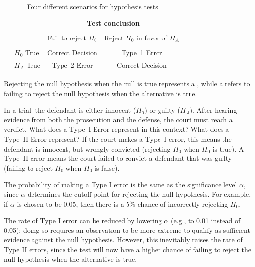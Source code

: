 \begin{table}[ht]
	\centering
	\begin{tabular}{l l c c}
		& & \multicolumn{2}{c}{\textbf{Test conclusion}} \\
		\cline{3-4}
		\vspace{-3.7mm} \\
		& & Fail to reject $H_0$ &  Reject $H_0$ in favor of $H_A$ \\
		\cline{2-4}
		\vspace{-3.7mm} \\
		& $H_0$ True & Correct Decision &  Type~1 Error \\
		\raisebox{1.5ex}{\textbf{Reality}} & $H_A$ True & Type~2 Error & Correct Decision\\
		\cline{2-4}
	\end{tabular}
	\caption{Four different scenarios for hypothesis tests.}
	\label{fourHTScenarios}
\end{table}

Rejecting the null hypothesis when the null is true represents a , while a  refers to failing to reject the null hypothesis when the alternative is true. 

\begin{example}
{In a trial, the defendant is either innocent ($H_0$) or guilty ($H_A$). After hearing evidence from both the prosecution and the defense, the court must reach a verdict. What does a Type~I Error represent in this context? What does a Type~II Error represent?}	
If the court makes a Type~I error, this means the defendant is innocent, but wrongly convicted (rejecting $H_0$ when $H_0$ is true). A Type~II error means the court failed to convict a defendant that was guilty (failing to reject $H_0$ when $H_0$ is false).		
\label{whatAreTheErrorTypesInUSCourts}	
\end{example}

The probability of making a Type I error is the same as the significance level $\alpha$, since $\alpha$ determines the cutoff point for rejecting the null hypothesis. For example, if $\alpha$ is chosen to be 0.05, then there is a 5\% chance of incorrectly rejecting $H_0$. 

The rate of Type I error can be reduced by lowering $\alpha$ (e.g., to 0.01 instead of 0.05); doing so requires an observation to be more extreme to qualify as sufficient evidence against the null hypothesis. However, this inevitably raises the rate of Type II errors, since the test will now have a higher chance of failing to reject the null hypothesis when the alternative is true.

